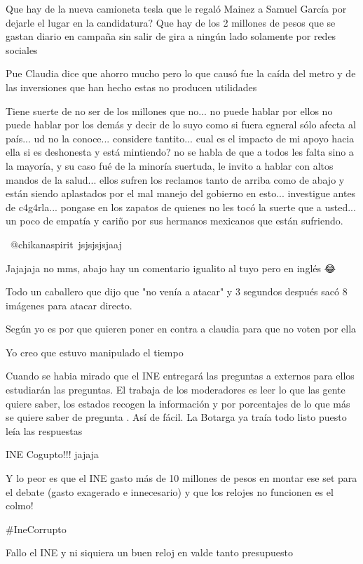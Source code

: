 Que hay de la nueva camioneta tesla que le regaló Mainez a Samuel García por dejarle el lugar en la candidatura? Que hay de los 2 millones de pesos que se gastan diario en campaña sin salir de gira a ningún lado solamente por redes sociales

Pue Claudia dice que ahorro mucho pero lo que causó fue la caída del metro y de las inversiones que han hecho estas no producen utilidades

Tiene suerte de no ser de los millones que no... no puede hablar por ellos no puede hablar por los demás y decir de lo suyo como si fuera egneral sólo afecta al país... ud no la conoce... considere tantito... cual es el impacto de mi apoyo hacia ella si es deshonesta y está mintiendo? no se habla de que a todos les falta sino a la mayoría, y su caso fué de la minoría suertuda, le invito a hablar con altos mandos de la salud... ellos sufren los reclamos tanto de arriba como de abajo y están siendo aplastados por el mal manejo del gobierno en esto...  investigue antes de c4g4rla... pongase en los zapatos de quienes no les tocó la suerte que a usted... un poco de empatía y cariño por sus hermanos mexicanos que están sufriendo.

​ @chikanaspirit jsjsjsjsjaaj

Jajajaja no mms, abajo hay un comentario igualito al tuyo pero en inglés 😂

Todo un caballero que dijo que "no venía a atacar" y 3 segundos después sacó 8 imágenes para atacar directo. 🤣🤣🤣

Según yo es por que quieren poner en contra a claudia para que no voten por ella

Yo creo que estuvo manipulado el tiempo

Cuando se habia mirado que el INE entregará las preguntas a externos para ellos estudiarán las preguntas. El trabaja de los moderadores es leer lo que las gente quiere saber, los estados recogen la información y por porcentajes de lo que más se quiere saber de pregunta . Así de fácil. La Botarga ya traía todo listo puesto leía las respuestas

INE Cogupto!!! jajaja

Y lo peor es que el INE gasto más de 10 millones de pesos en montar ese set para el debate (gasto exagerado e innecesario) y que los relojes no funcionen es el colmo!

#IneCorrupto

Fallo el INE y ni siquiera un buen reloj en valde tanto presupuesto

